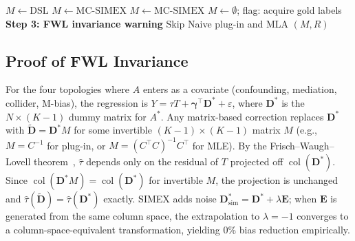 \begin{algorithm}[h]
\begin{algorithmic}[1]
\ELSE
    \STATE {}
        \STATE $M \gets \text{DSL}$ 
        \STATE $M \gets \text{MC-SIMEX}$ 
        \STATE $M \gets \text{MC-SIMEX}$ 
    \ELSE
        \STATE $M \gets \emptyset$; flag: acquire gold labels 
    \ENDIF
\ENDIF
\STATE
\STATE \textbf{Step 3: FWL invariance warning}
    \STATE Skip Naive plug-in and MLA 
\ENDIF
\RETURN $(M, R)$
\end{algorithmic}
\end{algorithm}

\subsection{Proof of FWL Invariance}
\label{app:fwl_proof}

For the four topologies where $A$ enters as a covariate (confounding, mediation, collider, M-bias), the regression is $Y = \tau T + \boldsymbol{\gamma}^\top \mathbf{D}^* + \varepsilon$, where $\mathbf{D}^*$ is the $N \times (K{-}1)$ dummy matrix for $A^*$. Any matrix-based correction replaces $\mathbf{D}^*$ with $\tilde{\mathbf{D}} = \mathbf{D}^* M$ for some invertible $(K{-}1) \times (K{-}1)$ matrix $M$ (e.g., $M = C^{-1}$ for plug-in, or $M = (C^\top C)^{-1} C^\top$ for MLE). By the Frisch--Waugh--Lovell theorem~\cite{lovell1963}, $\hat{\tau}$ depends only on the residual of $T$ projected off $\operatorname{col}(\mathbf{D}^*)$. Since $\operatorname{col}(\mathbf{D}^* M) = \operatorname{col}(\mathbf{D}^*)$ for invertible $M$, the projection is unchanged and $\hat{\tau}(\tilde{\mathbf{D}}) = \hat{\tau}(\mathbf{D}^*)$ exactly. SIMEX adds noise $\mathbf{D}^*_{\text{sim}} = \mathbf{D}^* + \lambda \mathbf{E}$; when $\mathbf{E}$ is generated from the same column space, the extrapolation to $\lambda = -1$ converges to a column-space-equivalent transformation, yielding 0\% bias reduction empirically.

